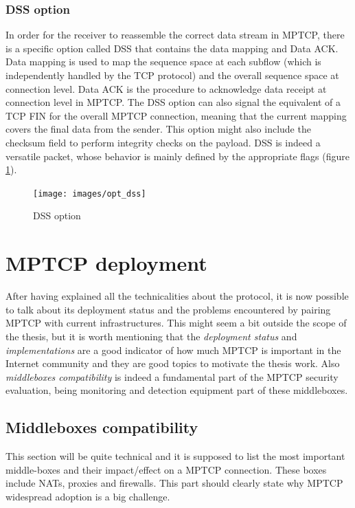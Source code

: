 \subsubsection{DSS option}
In order for the receiver to reassemble the correct data stream in MPTCP, there is a specific option called DSS that contains the data mapping and Data ACK. Data mapping is used to map the sequence space at each subflow (which is independently handled by the TCP protocol) and the overall sequence space at connection level. Data ACK is the procedure to acknowledge data receipt at connection level in MPTCP.
The DSS option can also signal the equivalent of a TCP FIN for the overall MPTCP connection, meaning that the current mapping covers the final data from the sender. 
This option might also include the checksum field to perform integrity checks on the payload.
DSS is indeed a versatile packet, whose behavior is mainly defined by the appropriate flags (figure \ref{fig:opt_dss}). 

\begin{figure}[!htb]
\centering
\texttt{[image: images/opt\_dss]}
\caption{DSS option}
\label{fig:opt_dss}
\end{figure}


\section{MPTCP deployment}
After having explained all the technicalities about the protocol, it is now possible to talk about its deployment status and the problems encountered by pairing MPTCP with current infrastructures. This might seem a bit outside the scope of the thesis, but it is worth mentioning that the \textit{deployment status} and \textit{implementations} are a good indicator of how much MPTCP is important in the Internet community and they are good topics to motivate the thesis work. Also \textit{middleboxes compatibility} is indeed a fundamental part of the MPTCP security evaluation, being monitoring and detection equipment part of these middleboxes.

\subsection{Middleboxes compatibility}
This section will be quite technical and it is supposed to list the most important middle-boxes and their impact/effect on a MPTCP connection. These boxes include NATs, proxies and firewalls. This part should clearly state why MPTCP widespread adoption is a big challenge.


